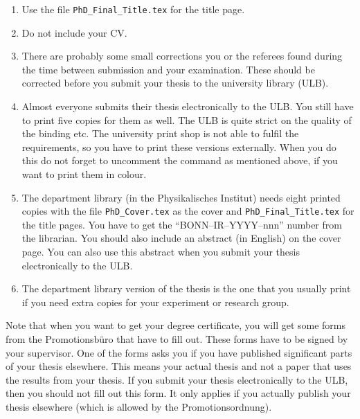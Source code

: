 \begin{enumerate}
\item Use the file \texttt{PhD\_Final\_Title.tex} for the title page.
\item Do not include your CV.
\item There are probably some small corrections you or the referees
  found during the time between submission and your examination. These
  should be corrected before you submit your thesis to the university
  library (ULB).
\item Almost everyone submits their thesis electronically to the
  ULB. You still have to print five copies for them as well. The ULB is
  quite strict on the quality of the binding etc. The university
  print shop is not able to fulfil the requirements, so you have to print
  these versions externally. When you do this do not forget to
  uncomment the  command as mentioned above, if you
  want to print them in colour.
\item The department
  library (in the Physikalisches
  Institut) needs eight printed copies with the file
  \texttt{PhD\_Cover.tex} as the cover and
  \texttt{PhD\_Final\_Title.tex} for the title pages. You have to get
  the \enquote{BONN--IR--YYYY--nnn} number from the librarian. You
  should also include an abstract (in English) on the cover page. You
  can also use this abstract when you submit your thesis
  electronically to the ULB.
\item The department library version of the thesis is the one that you usually print if
  you need extra copies for your experiment or research group.
\end{enumerate}

Note that when you want to get your degree certificate, you will get
some forms from the \foreignlanguage{ngerman}{Promotionsbüro} that have
to fill out. These forms have to be signed by your supervisor. One of
the forms asks you if you have published significant parts of your
thesis elsewhere. This means your actual thesis and not a paper that
uses the results from your thesis. If you submit your thesis
electronically to the ULB, then you should not fill out this form. It
only applies if you actually publish your thesis elsewhere (which is
allowed by the \foreignlanguage{ngerman}{Promotionsordnung}).

